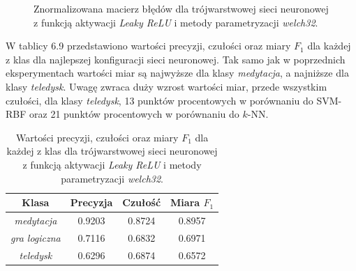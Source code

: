 \documentclass[notitlepage]{report}
\begin{document}
\begin{figure}[H]
	\centering
	\caption{Znormalizowana macierz błędów dla trójwarstwowej sieci neuronowej z funkcją aktywacji \textit{Leaky ReLU} i metody parametryzacji \textit{welch32}.}
\end{figure}

W tablicy 6.9 przedstawiono wartości precyzji, czułości oraz miary $F_1$ dla każdej z klas dla najlepszej konfiguracji sieci neuronowej. Tak samo jak w poprzednich eksperymentach wartości miar są najwyższe dla klasy \textit{medytacja}, a najniższe dla klasy \textit{teledysk}. Uwagę zwraca duży wzrost wartości miar, przede wszystkim czułości, dla klasy \textit{teledysk}, 13 punktów procentowych w porównaniu do SVM-RBF oraz 21 punktów procentowych w porównaniu do $k$-NN.

 \begin{table}[H]
	\centering
	\small
	\setlength\tabcolsep{2pt}
	\begin{tabular}{| c | c | c | c |}
		\hline
	 Klasa & Precyzja  & Czułość & Miara $F_1$ \\ \hline
	 \textit{medytacja} & 0.9203 & 0.8724 & 0.8957 \\
	 \textit{gra logiczna} & 0.7116 & 0.6832 & 0.6971\\
	 \textit{teledysk} & 0.6296 & 0.6874 & 0.6572\\ \hline
	\end{tabular}
	\caption{Wartości precyzji, czułości oraz miary $F_1$ dla każdej z klas  dla trójwarstwowej sieci neuronowej z funkcją aktywacji \textit{Leaky ReLU} i metody parametryzacji \textit{welch32}.}
\end{table}
\end{document}
